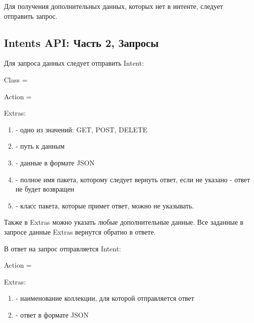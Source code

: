 \documentclass[a4paper,10pt,russian]{sphinxmanual}
\begin{document}
Для получения дополнительных данных, которых нет в интенте, следует отправить запрос.


\subsection{Intents API: Часть 2, Запросы}
\label{\detokenize{api:intents-api-2}}
Для запроса данных следует отправить Intent:

Class = 

Action = 

Extras:
\begin{enumerate}
\def\theenumi{\arabic{enumi}}
\def\labelenumi{\theenumi .}
\makeatletter\def\p@enumii{\p@enumi \theenumi .}\makeatother
\item {} 
 - одно из значений: GET, POST, DELETE

\item {} 
 - путь к данным

\item {} 
 - данные в формате JSON

\item {} 
 - полное имя пакета, которому следует вернуть ответ, если не указано - ответ не будет возвращен

\item {} 
 - класс пакета, которые примет ответ, можно не указывать.

\end{enumerate}

Также в Extras можно указать любые дополнительные данные. Все заданные в запросе данные Extras вернутся обратно  в ответе.

В ответ на запрос отправляется Intent:

Action = 

Extras:
\begin{enumerate}
\def\theenumi{\arabic{enumi}}
\def\labelenumi{\theenumi .}
\makeatletter\def\p@enumii{\p@enumi \theenumi .}\makeatother
\item {} 
 - наименование коллекции, для которой отправляется ответ

\item {} 
 - ответ в формате JSON

\end{enumerate}
\end{document}

